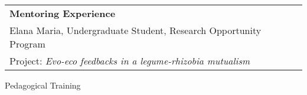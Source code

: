 \documentclass[letterpaper,11pt,oneside]{article}
\begin{document}
\def\arraystretch{1.1}
\noindent \begin{longtable}{@{} >{\raggedright\arraybackslash}p{15.5cm} >{\raggedright\arraybackslash}p{1.7cm}}
 \textbf{Mentoring Experience}  & \\
Elana Maria, Undergraduate Student, Research Opportunity Program & 2021 \\
  \hspace{5mm}Project: \textit{Evo-eco feedbacks in a legume-rhizobia mutualism} &  \\

 \end{longtable}
 
 \bigskip





\noindent\Large{Pedagogical Training}
\normalsize
\bigskip
\end{document}
